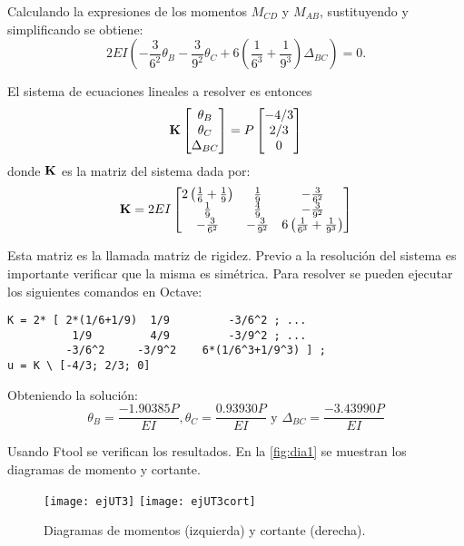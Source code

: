 Calculando la expresiones de los momentos $M_{CD}$ y $M_{AB}$, sustituyendo y simplificando se obtiene:
\begin{equation}
\boxed{
	2EI \left( -\frac{3}{6^2} \theta_B - \frac{3}{9^2} \theta_C + 6 \left( \frac{1}{6^3} +  \frac{1}{9^3} \right) \Delta_{BC} \right) = 0.
}
\end{equation}

El sistema de ecuaciones lineales a resolver es entonces
\begin{equation}
{\bf K}   
\left[
\begin{matrix}
\theta_B\\
\theta_C\\
\Delta_{BC}
\end{matrix}
\right]
=
P
\left[
\begin{matrix}
-4/3\\
2/3\\
0
\end{matrix}
\right]
\end{equation}
donde ${\bf K}$ es la matriz del sistema dada por: 
\begin{equation}
{\bf K} =
2EI \left[
\begin{matrix}
2 \left( \frac{1}{6}+ \frac{1}{9}\right) & \frac{1}{9} & -\frac{3}{6^2}\\
\frac{1}{9} & \frac{4}{9} & -\frac{3}{9^2}\\
-\frac{3}{6^2} & -\frac{3}{9^2} &  6\left( \frac{1}{6^3}  + \frac{1}{9^3}\right)
\end{matrix}
\right]
\end{equation}

Esta matriz es la llamada matriz de rigidez. Previo a la resolución del sistema es importante verificar que la misma es simétrica. %
%
Para resolver se pueden ejecutar los siguientes comandos en Octave:

\begin{verbatim}
K = 2* [ 2*(1/6+1/9)  1/9         -3/6^2 ; ...
          1/9         4/9         -3/9^2 ; ...
         -3/6^2     -3/9^2    6*(1/6^3+1/9^3) ] ;
u = K \ [-4/3; 2/3; 0]
\end{verbatim}


Obteniendo la solución:
\begin{equation}
\theta_B = \frac{ -1.90385 P }{EI}, \theta_C = \frac{ 0.93930
 P }{EI} \text{ y } \Delta_{BC} = \frac{-3.43990 P }{EI}
\end{equation}

Usando Ftool se verifican los resultados. En la \autoref{fig:dia1} se muestran los diagramas de momento y cortante.
\begin{figure}[htb]
	\centering
	\texttt{[image: ejUT3]}
	\texttt{[image: ejUT3cort]}
	\caption{Diagramas de momentos (izquierda) y cortante (derecha).}
	\label{fig:dia1}
\end{figure}


